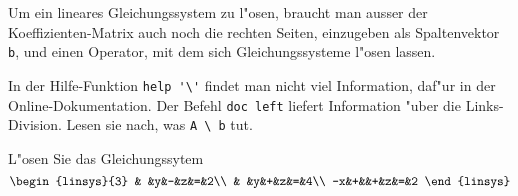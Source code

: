 Um ein lineares Gleichungssystem zu l"osen, braucht man ausser
der Koeffizienten-Matrix auch noch die rechten Seiten, einzugeben
als Spaltenvektor {\tt b}, und einen Operator, mit dem sich
Gleichungssysteme l"osen lassen.
\begin{teilaufgaben}
\item In der Hilfe-Funktion \verb+help '\'+ findet man nicht
viel Information, daf"ur in der Online-Dokumentation. Der
Befehl \verb+doc left+ liefert Information "uber die Links-Division.
Lesen sie nach, was \verb+A \ b+ tut.
\item L"osen Sie das Gleichungssytem
\[
\begin{linsys}{3}
 & &y&-&z&=&2\\
 & &y&+&z&=&4\\
-x&+&&+&z&=&2
\end{linsys}
\]
\end{teilaufgaben}

\begin{loesung}
\begin{teilaufgaben}
\item
\item
{}
\end{teilaufgaben}
\end{loesung}

